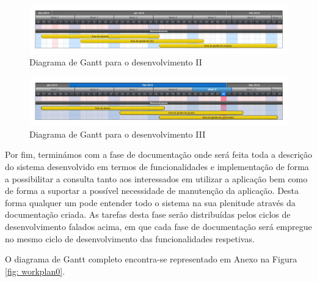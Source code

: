 \begin{figure}[H] 
  \centering
  \includegraphics[width=1\textwidth]{images/plano_de_trabalho/gannt_3.png}
  \caption{Diagrama de Gantt para o desenvolvimento II}
  \label{fig: workplan3}
\end{figure}

\begin{figure}[H] 
  \centering
  \includegraphics[width=1\textwidth]{images/plano_de_trabalho/gannt_4.png}
  \caption{Diagrama de Gantt para o desenvolvimento III}
  \label{fig: workplan4}
\end{figure}

Por fim, terminámos com a fase de documentação onde será feita toda a descrição 
do sistema desenvolvido em termos de funcionalidades e implementação de forma a 
possibilitar a consulta tanto aos interessados em utilizar a aplicação bem como 
de forma a suportar a possível necessidade de manutenção da aplicação. Desta 
forma qualquer um pode entender todo o sistema na sua plenitude através da 
documentação criada. As tarefas desta fase serão distribuídas pelos ciclos de 
desenvolvimento falados acima, em que cada fase de documentação será empregue no 
mesmo ciclo de desenvolvimento das funcionalidades respetivas.

O diagrama de Gantt completo encontra-se representado em Anexo na Figura \ref{fig: 
workplan0}.

\newpage
